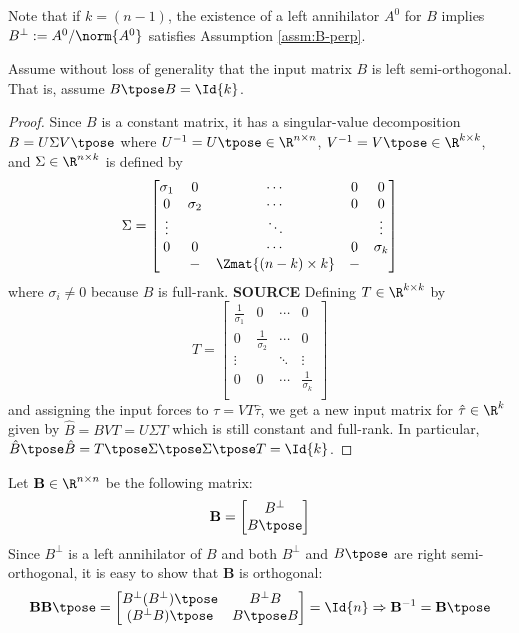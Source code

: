Note that if \(k = (n-1)\), the existence of a left annihilator \(A^0\) for
\(B\) implies \(B^\perp := A^0/\norm{A^0}\) satisfies Assumption
\ref{assm:B-perp}.

\begin{assm}\label{assm:B-orthogonal}
    Assume without loss of generality that the input matrix \(B\) is left
    semi-orthogonal.
    That is, assume \(B\tpose B = \Id{k}\).
\end{assm}
\begin{proof}
Since \(B\) is a constant matrix, 
it has a singular-value decomposition 
\(B = U \Sigma V\tpose\) where \(U^{-1} = U\tpose \in \R^{n \times n}\), 
\(V^{-1} = V\tpose \in \R^{k \times k}\), and \(\Sigma \in \R^{n \times k}\) is
defined by
\[
    \Sigma = \begin{bmatrix}
        \sigma_1 & 0 & \cdots & 0 & 0 \\
        0 & \sigma_2 & \cdots & 0 & 0 \\
        \vdots & & \ddots &  & \vdots \\
        0 & 0 & \cdots & 0 & \sigma_k \\
          & - & \Zmat{(n-k)\times k} & -  &\\
    \end{bmatrix}
\]
where \(\sigma_i \neq 0\) because \(B\) is full-rank.
\textbf{SOURCE}
Defining \(T \in \R^{k \times k}\) by
\[
    T = \begin{bmatrix}
        \frac{1}{\sigma_1} & 0 & \cdots & 0 \\
        0 & \frac{1}{\sigma_2} & \cdots & 0 \\
    \vdots & & \ddots & \vdots \\
    0 & 0 & \cdots & \frac{1}{\sigma_k} \\
    \end{bmatrix}
\]
and assigning the input forces to \(\tau = V T \hat{\tau}\), we get a new input
matrix for \(\hat{\tau} \in \R^k\) given by \(\hat{B} = B V T = U \Sigma T\) 
which is still constant and full-rank. In particular, 
\(\hat{B}\tpose \hat{B} = T\tpose \Sigma\tpose \Sigma\tpose T = \Id{k}\).
\end{proof}

Let \(\mathbf{B} \in \R^{n\times n}\) be the following matrix:
\[
    \mathbf{B} = 
    \begin{bmatrix}
        B^\perp \\
        B\tpose \\
    \end{bmatrix}
\]
Since \(B^\perp\) is a left annihilator of \(B\) and both \(B^\perp\) and
\(B\tpose\) are right semi-orthogonal, it is easy to show that \(\mathbf{B}\) is
orthogonal:
\[
    \mathbf{B}\mathbf{B}\tpose = 
    \begin{bmatrix}
        B^\perp (B^\perp)\tpose & B^\perp B \\
        (B^\perp B)\tpose & B\tpose B
    \end{bmatrix} = \Id{n}
    \Rightarrow
    \mathbf{B}^{-1} = \mathbf{B}\tpose
\]

